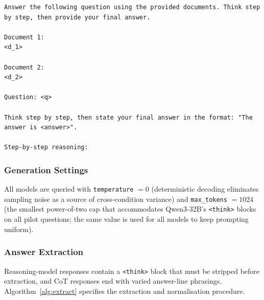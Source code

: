 \begin{lstlisting}[caption={Chain-of-thought prompt template used for all four models, reproduced verbatim from \texttt{src/inference/prompt\_templates.py}. Document labels are deliberately neutral (``Document 1/2'') rather than semantically descriptive (e.g., ``Bridge Article''), so the model cannot infer hop roles from the labels. The 3-hop template appends ``Document 3:'' with the same structure.}, label={lst:prompt}]
Answer the following question using the provided documents. Think step by step, then provide your final answer.

Document 1:
<d_1>

Document 2:
<d_2>

Question: <q>

Think step by step, then state your final answer in the format: "The answer is <answer>".

Step-by-step reasoning:
\end{lstlisting}

\subsubsection{Generation Settings}

All models are queried with \texttt{temperature} $= 0$ (deterministic decoding eliminates sampling noise as a source of cross-condition variance) and \texttt{max\_tokens} $= 1024$ (the smallest power-of-two cap that accommodates Qwen3-32B's \texttt{<think>} blocks on all pilot questions; the same value is used for all models to keep prompting uniform).

\subsubsection{Answer Extraction}

Reasoning-model responses contain a \texttt{<think>} block that must be stripped before extraction, and CoT responses end with varied answer-line phrasings. Algorithm~\ref{alg:extract} specifies the extraction and normalisation procedure.


